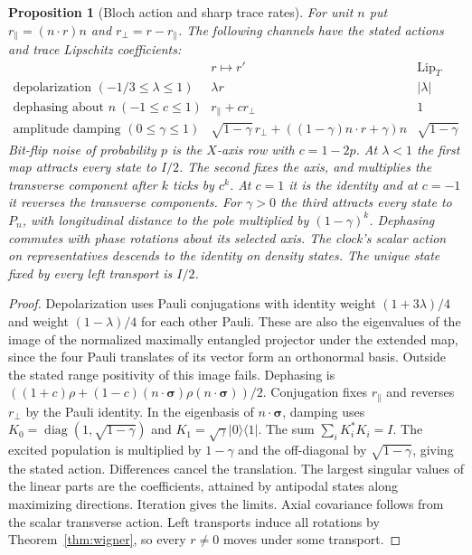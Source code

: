 \documentclass[aps,pra,onecolumn,superscriptaddress,nofootinbib,10pt]{revtex4-2}
\newtheorem{proposition}[theorem]{Proposition}
\theoremstyle{definition}
\theoremstyle{remark}
\begin{document}
\begin{proposition}[Bloch action and sharp trace rates]\label{ob:noise}
For unit $n$ put $r_\parallel=(n\cdot r)n$ and $r_\perp=r-r_\parallel$.
The following channels have the stated actions and trace Lipschitz coefficients:
\[
\begin{array}{l|c|c}
 & r\mapsto r' & \operatorname{Lip}_T\\ \hline
\text{depolarization }(-1/3\le\lambda\le1)&\lambda r&|\lambda|\\
\text{dephasing about }n\ (-1\le c\le1)&r_\parallel+c r_\perp&1\\
\text{amplitude damping }(0\le\gamma\le1)
 & \sqrt{1-\gamma}\,r_\perp+((1-\gamma)n\cdot r+\gamma)n
 &\sqrt{1-\gamma}
\end{array}
\]
Bit-flip noise of probability $p$ is the $X$-axis row with $c=1-2p$.
At $\lambda<1$ the first map attracts every state to $I/2$.
The second fixes the axis, and multiplies the transverse component
after $k$ ticks by $c^k$. At $c=1$ it is the identity and at $c=-1$
it reverses the transverse components. For $\gamma>0$ the third
attracts every state to $P_n$, with longitudinal distance to the pole
multiplied by $(1-\gamma)^k$. Dephasing commutes with phase rotations
about its selected axis. The clock's scalar action on representatives
descends to the identity on density states. The unique state fixed by
every left transport is $I/2$.
\end{proposition}
\begin{proof}
Depolarization uses Pauli conjugations with identity weight
$(1+3\lambda)/4$ and weight $(1-\lambda)/4$ for each other Pauli.
These are also the eigenvalues of the image of the normalized
maximally entangled projector under the extended map, since the
four Pauli translates of its vector form an orthonormal basis.
Outside the stated range positivity of this image fails.
Dephasing is
$((1+c)\rho+(1-c)(n\cdot\boldsymbol{\sigma})\rho(n\cdot\boldsymbol{\sigma}))/2$.
Conjugation fixes $r_\parallel$ and reverses $r_\perp$ by the Pauli identity.
In the eigenbasis of $n\cdot\boldsymbol{\sigma}$, damping uses
$K_0=\operatorname{diag}(1,\sqrt{1-\gamma})$ and
$K_1=\sqrt\gamma|0\rangle\langle1|$. The sum $\sum_i K_i^*K_i=I$.
The excited population is multiplied by $1-\gamma$ and the
off-diagonal by $\sqrt{1-\gamma}$, giving the stated action.
Differences cancel the translation. The largest singular values of the
linear parts are the coefficients, attained by antipodal states along
maximizing directions. Iteration gives the limits. Axial covariance
follows from the scalar transverse action. Left transports induce
all rotations by Theorem~\ref{thm:wigner}, so every $r\ne0$ moves
under some transport.
\end{proof}
\end{document}
